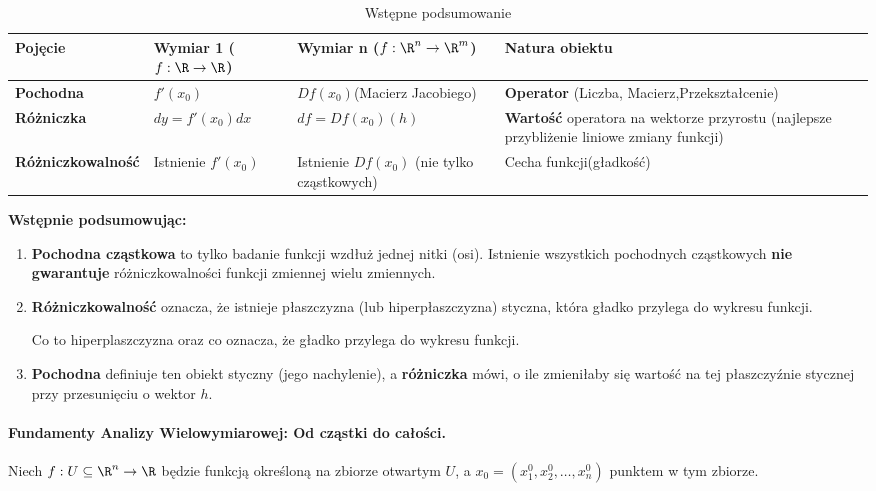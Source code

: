 \begin{table}[H]
	\centering
	\caption{Wstępne podsumowanie}
	\begin{tabularx}{\textwidth}{l X X X}
	\toprule
	Pojęcie & Wymiar 1 ($f:\R\to\R$) & Wymiar n ($f: \R^{n}\to\R^{m}$) & Natura obiektu \\
	\midrule
	\textbf{Pochodna} & $f'\left( x_0 \right) $ & $Df\left( x_0 \right)$(Macierz Jacobiego) & \textbf{Operator} (Liczba, Macierz,Przekształcenie)\\
	\addlinespace
	\textbf{Różniczka} & $dy = f'\left( x_0 \right) dx$ & $df = Df\left( x_0 \right)\left( h \right) $ & \textbf{Wartość} operatora na wektorze przyrostu (najlepsze przybliżenie liniowe zmiany funkcji) \\
	\addlinespace
	\textbf{Różniczkowalność} & Istnienie $f'\left( x_0 \right) $ & Istnienie $Df\left( x_0 \right)$ (nie tylko cząstkowych) & Cecha funkcji(gładkość) \\
	\bottomrule
	\end{tabularx}
\end{table}
\textbf{Wstępnie podsumowując:} 
\begin{enumerate}[label=\arabic*.]
	\item \textbf{Pochodna cząstkowa} to tylko badanie funkcji wzdłuż jednej nitki (osi). Istnienie wszystkich pochodnych cząstkowych \textbf{nie gwarantuje} różniczkowalności funkcji zmiennej wielu zmiennych.
	\item \textbf{Różniczkowalność} oznacza, że istnieje płaszczyzna (lub hiperpłaszczyzna) styczna, która gładko przylega do wykresu funkcji.
		\begin{remark}
			Co to hiperplaszczyzna oraz co oznacza, że gładko przylega do wykresu funkcji.
		\end{remark} 
	\item \textbf{Pochodna} definiuje ten obiekt styczny (jego nachylenie), a \textbf{różniczka} mówi, o ile zmieniłaby się wartość na tej płaszczyźnie stycznej przy przesunięciu o wektor $h$. 
\end{enumerate}
\paragraph{Fundamenty Analizy Wielowymiarowej: Od cząstki do całości.}

Niech $f:U \subseteq \R^{n}\to\R$ będzie funkcją określoną na zbiorze otwartym $U$, a $x_0 = \left( x_1^{0},x_2^{0},\ldots, x_{n}^{0} \right) $ punktem w tym zbiorze.

